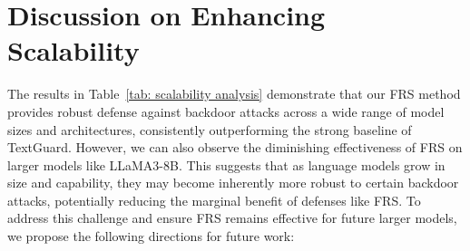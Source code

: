 \section{Discussion on Enhancing Scalability}
\label{appendix: enhancing scalability}
The results in Table~\ref{tab: scalability analysis} demonstrate that our FRS method provides robust defense against backdoor attacks across a wide range of model sizes and architectures, consistently outperforming the strong baseline of TextGuard. However, we can also observe the diminishing effectiveness of FRS on larger models like LLaMA3-8B. This suggests that as language models grow in size and capability, they may become inherently more robust to certain backdoor attacks, potentially reducing the marginal benefit of defenses like FRS. To address this challenge and ensure FRS remains effective for future larger models, we propose the following directions for future work:
